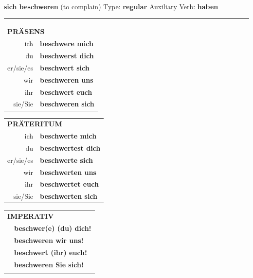 \documentclass[10pt,a4paper]{revtex4-2}
\begin{document}
\begin{verbbox}
        {\Large \bf sich beschweren} (to complain) \hfill Type: \textbf{regular} \hfill Auxiliary Verb: \textbf{haben} 
    
       \vspace{5pt}

    \hrule
    
    \vspace{5pt}

  \begin{tabular}{rl}
     \multicolumn{2}{l}{\textbf{PRÄSENS} }\\
    ich & \textbf{beschwere mich}\\
    du & \textbf{beschwerst dich}\\
    er/sie/es & \textbf{beschwert sich}\\
    wir & \textbf{beschweren uns}\\
    ihr & \textbf{beschwert euch}\\
    sie/Sie & \textbf{beschweren sich}\\
  \end{tabular}
  \hfill
     \begin{tabular}{rl}
    \multicolumn{2}{l}{\textbf{PRÄTERITUM} }\\
    ich & \textbf{beschwerte mich}\\
    du & \textbf{beschwertest dich}\\
    er/sie/es & \textbf{beschwerte sich}\\
    wir & \textbf{beschwerten uns}\\
    ihr & \textbf{beschwertet euch}\\
    sie/Sie & \textbf{beschwerten sich}\\
  \end{tabular}
  \hfill
  \begin{tabular}{rl}
     \multicolumn{2}{l}{\textbf{IMPERATIV} }\\
   & \textbf{beschwer(e) (du) dich!}\\
   & \textbf{beschweren wir uns!}\\
   & \textbf{beschwert (ihr) euch!}\\
   & \textbf{beschweren Sie sich!}\\
   & \vspace{10pt}
  \end{tabular}

    \vspace{10pt}


\end{verbbox}
\end{document}
